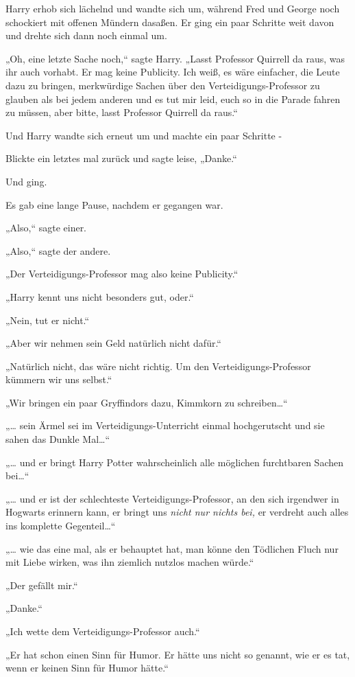 {Harry erhob sich lächelnd und wandte sich um, während Fred und George noch schockiert mit offenen Mündern dasaßen. Er ging ein paar Schritte weit davon und drehte sich dann noch einmal um.

„Oh, eine letzte Sache noch,“ sagte Harry. „Lasst Professor Quirrell da raus, was ihr auch vorhabt. Er mag keine Publicity. Ich weiß, es wäre einfacher, die Leute dazu zu bringen, merkwürdige Sachen über den Verteidigungs-Professor zu glauben als bei jedem anderen und es tut mir leid, euch so in die Parade fahren zu müssen, aber bitte, lasst Professor Quirrell da raus.“

Und Harry wandte sich erneut um und machte ein paar Schritte -

Blickte ein letztes mal zurück und sagte leise, „Danke.“

Und ging.

Es gab eine lange Pause, nachdem er gegangen war.

„Also,“ sagte einer.

„Also,“ sagte der andere.

„Der Verteidigungs-Professor mag also keine Publicity.“

„Harry kennt uns nicht besonders gut, oder.“

„Nein, tut er nicht.“

„Aber wir nehmen sein Geld natürlich nicht dafür.“

„Natürlich nicht, das wäre nicht richtig. Um den Verteidigungs-Professor kümmern wir uns selbst.“

„Wir bringen ein paar Gryffindors dazu, Kimmkorn zu schreiben…“

„… sein Ärmel sei im Verteidigungs-Unterricht einmal hochgerutscht und sie sahen das Dunkle Mal…“

„… und er bringt Harry Potter wahrscheinlich alle möglichen furchtbaren Sachen bei…“

„… und er ist der schlechteste Verteidigungs-Professor, an den sich irgendwer in Hogwarts erinnern kann, er bringt uns \emph{nicht nur nichts bei,} er verdreht auch alles ins komplette Gegenteil…“

„… wie das eine mal, als er behauptet hat, man könne den Tödlichen Fluch nur mit Liebe wirken, was ihn ziemlich nutzlos machen würde.“

„Der gefällt mir.“

„Danke.“

„Ich wette dem Verteidigungs-Professor auch.“

„Er hat schon einen Sinn für Humor. Er hätte uns nicht so genannt, wie er es tat, wenn er keinen Sinn für Humor hätte.“

}
